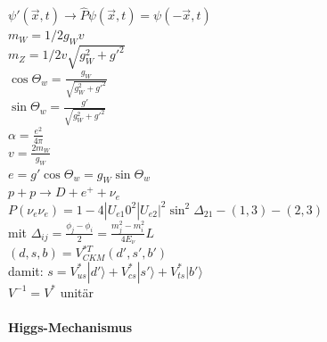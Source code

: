 \documentclass[12pt,a4paper]{article}
\renewcommand{\=}[1]{\stackrel{#1}{=}}
\theoremstyle{definition}
\theoremstyle{remark}
\begin{document}
\begin{center}
\begin{minipage}[t]{.35\linewidth}
\vspace{0pt}
\noindent\begin{tabular}{ll}
\toprule

\bottomrule
\end{tabular}
\end{minipage}%
\begin{minipage}[t]{.65\linewidth}
\vspace{0pt}
\begin{tabular}{ll}
\toprule


\end{tabular}
\end{minipage}
\end{center}

$\psi' (\vec x, t) \rightarrow \hat P \psi (\vec x, t) = \psi (- \vec x, t)$\\
$m_W = 1/2 g_W v$\\
$m_Z = 1/2 v \sqrt{g_W^2 + g'^2}$\\
$\cos \Theta_w = \frac{g_W}{\sqrt{g_W^2 + g'^2}}$\\
$\sin \Theta_w = \frac{g'}{\sqrt{g_W^2 + g'^2}}$\\
$\alpha = \frac{e^2}{4\pi}$\\
$v = \frac{2m_W}{g_W}$\\
$e = g' \cos \Theta_w = g_W \sin \Theta_w$\\
$p + p \rightarrow D + e^+ + \nu_e$\\
$P(\nu_e \nu_e) = 1-4 |U_{e1}0^2 |U_{e2}|^2 \sin^2 \Delta_{21} - (1,3) - (2,3)$\\
mit $\Delta_{ij} = \frac{\phi_j - \phi_i}{2} = \frac{m_j^2 - m_i^2}{4E_{\nu}}L$\\
$(d,s,b) = V_{CKM}^{*T} (d', s', b')$\\
damit: $s = V_{us}^* |d'\rangle + V_{cs}^* |s'\rangle + V_{ts}^* |b'\rangle$\\
$V^{-1} =  V^{*}$ unitär

\paragraph{Higgs-Mechanismus}

\begin{center}
\begin{minipage}[t]{.35\linewidth}
\vspace{0pt}
\noindent\begin{tabular}{ll}
\toprule

\bottomrule
\end{tabular}
\end{minipage}%
\begin{minipage}[t]{.65\linewidth}
\vspace{0pt}
\begin{tabular}{ll}
\toprule


\end{tabular}
\end{minipage}
\end{center}
\end{document}
